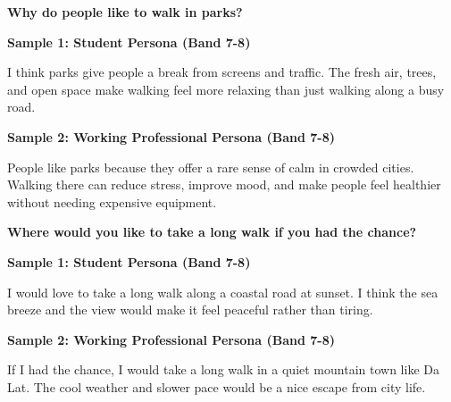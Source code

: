 \begin{ieltsquestion}
\textbf{Why do people like to walk in parks?}
\end{ieltsquestion}
\textbf{Sample 1: Student Persona (Band 7-8)}

I think parks give people a break from screens and traffic. The fresh air, trees, and open space make walking feel more relaxing than just walking along a busy road.

\textbf{Sample 2: Working Professional Persona (Band 7-8)}

People like parks because they offer a rare sense of calm in crowded cities. Walking there can reduce stress, improve mood, and make people feel healthier without needing expensive equipment.

\separator

\begin{ieltsquestion}
\textbf{Where would you like to take a long walk if you had the chance?}
\end{ieltsquestion}
\textbf{Sample 1: Student Persona (Band 7-8)}

I would love to take a long walk along a coastal road at sunset. I think the sea breeze and the view would make it feel peaceful rather than tiring.

\textbf{Sample 2: Working Professional Persona (Band 7-8)}

If I had the chance, I would take a long walk in a quiet mountain town like Da Lat. The cool weather and slower pace would be a nice escape from city life.

\separator


